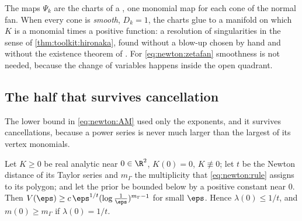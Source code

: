 \begin{refsection}
The maps $\Psi_k$ are the charts of a , one monomial map for each cone of the normal fan. When every cone is \emph{smooth}, $D_k=1$, the charts glue to a manifold on which $K$ is a monomial times a positive function: a resolution of singularities in the sense of \cref{thm:toolkit:hironaka}, found without a blow-up chosen by hand and without the existence theorem of \textcite{Hironaka1964a}. For \eqref{eq:newton:zetafan} smoothness is not needed, because the change of variables happens inside the open quadrant.

\subsection{The half that survives cancellation}

The lower bound in \eqref{eq:newton:AM} used only the exponents, and it survives cancellations, because a power series is never much larger than the largest of its vertex monomials.

\begin{corollary}\label{cor:newton:bound}
Let $K\ge0$ be real analytic near $0\in\R^2$, $K(0)=0$, $K\not\equiv0$; let $t$ be the Newton distance of its Taylor series and $m_\Gamma$ the multiplicity that \eqref{eq:newton:rule} assigns to its polygon; and let the prior be bounded below by a positive constant near $0$. Then $V(\eps)\ge c\,\eps^{1/t}(\log\frac1\eps)^{m_\Gamma-1}$ for small $\eps$. Hence $\lambda(0)\le1/t$, and $m(0)\ge m_\Gamma$ if $\lambda(0)=1/t$.
\end{corollary}


\end{refsection}

